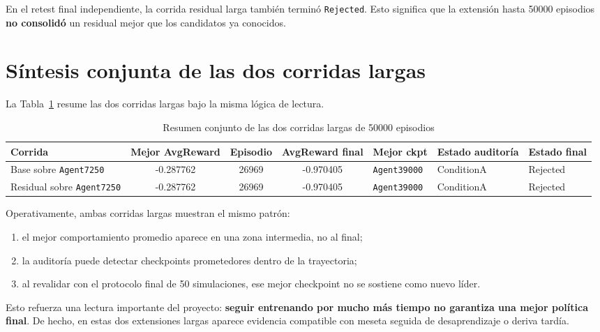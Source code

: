 \documentclass[11pt,a4paper]{article}
\begin{document}
En el retest final independiente, la corrida residual larga tambi\'en termin\'o \texttt{Rejected}. Esto significa que la extensi\'on hasta 50000 episodios \textbf{no consolid\'o} un residual mejor que los candidatos ya conocidos.

\section*{S\'intesis conjunta de las dos corridas largas}
La Tabla~\ref{tab:joint} resume las dos corridas largas bajo la misma l\'ogica de lectura.

\begin{table}[H]
\centering
\caption{Resumen conjunto de las dos corridas largas de 50000 episodios}
\label{tab:joint}
\scriptsize
\begin{tabularx}{\linewidth}{>{\raggedright\arraybackslash}p{2.35cm} c c c >{\raggedright\arraybackslash}p{1.65cm} >{\raggedright\arraybackslash}p{1.65cm} >{\raggedright\arraybackslash}p{1.35cm}}
\toprule
Corrida & Mejor AvgReward & Episodio & AvgReward final & Mejor ckpt & Estado auditor\'ia & Estado final \\
\midrule
Base sobre \texttt{Agent7250} & -0.287762 & 26969 & -0.970405 & \texttt{Agent39000} & ConditionA & Rejected \\
Residual sobre \texttt{Agent7250} & -0.287762 & 26969 & -0.970405 & \texttt{Agent39000} & ConditionA & Rejected \\
\bottomrule
\end{tabularx}
\end{table}

Operativamente, ambas corridas largas muestran el mismo patr\'on:
\begin{enumerate}
    \item el mejor comportamiento promedio aparece en una zona intermedia, no al final;
    \item la auditor\'ia puede detectar checkpoints prometedores dentro de la trayectoria;
    \item al revalidar con el protocolo final de 50 simulaciones, ese mejor checkpoint no se sostiene como nuevo l\'ider.
\end{enumerate}

Esto refuerza una lectura importante del proyecto: \textbf{seguir entrenando por mucho m\'as tiempo no garantiza una mejor pol\'itica final}. De hecho, en estas dos extensiones largas aparece evidencia compatible con meseta seguida de desaprendizaje o deriva tard\'ia.
\end{document}
